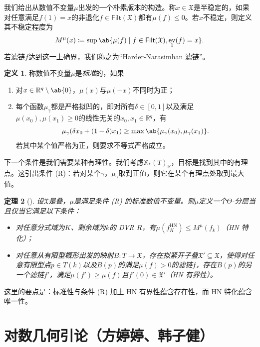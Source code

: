 \documentclass{amsart}
\newtheorem{thm}{定理}[section]
\theoremstyle{definition}
\newtheorem{defn}[thm]{定义}
\theoremstyle{remark}
\theoremstyle{plain}
\theoremstyle{definition}
\theoremstyle{remark}
\newcommand{\R}{\mathbb{R}}
\newcommand{\mf}[1]{\mathfrak{#1}}
\newcommand{\mr}[1]{\mathrm{#1}}
\newcommand{\ms}[1]{\mathsf{#1}}
\newcommand{\1}{\mathbf{1}}
\newcommand{\2}{\mathbf{2}}
\newcommand{\3}{\mathbf{3}}
\DeclareMathOperator{\ev}{ev}
\begin{document}
我们给出从数值不变量\(\mu\)出发的一个朴素版本的构造。称\(x \in \mf{X}\)是半稳定的，如果对任意满足\(f(1) = x\)的非退化\(f \in \ms{Filt}(\mf{X})\)都有\(\mu(f) \leq 0\)。若\(x\)不稳定，则定义其不稳定程度为
\[ M^{\mu}(x) \coloneqq \sup \ab\{ \mu(f) \mid f \in \ms{Filt}(\mf{X}), \ev_1(f) = x\}. \]
若滤链\(f\)达到这一上确界，我们称之为“Harder-Narasimhan 滤链”。

\begin{defn}
    称数值不变量\(\mu\)是\textit{标准}的，如果
    \begin{enumerate}
        \item 对\(x \in \R^q \setminus \ab\{0\}\)，\(\mu(x)\)与\(\mu(-x)\)不同时为正；
        \item 每个函数\(\mu_{\gamma}\)都是严格拟凹的，即对所有\(\delta \in [0,1]\)以及满足\(\mu(x_0), \mu(x_1) \geq 0\)的线性无关的\(x_0, x_1 \in \R^q\)，有
            \[\mu_{\gamma}(\delta x_0 + (1-\delta)x_1) \geq \max\ab\{\mu_{\gamma}(x_0), \mu_{\gamma}(x_1)\}.\] 若其中某个值严格为正，则要求不等式严格成立。
    \end{enumerate}
\end{defn}

下一个条件是我们需要某种有理性。我们考虑\(\mathbb{X}_*(T)_{\R}\)，目标是找到其中的有理点。这引出条件 (R)：若对某个\(\gamma\)，\(\mu_{\gamma}\)取到正值，则它在某个有理点处取到最大值。

\begin{thm}[{\cite{HLinstability}}]
    设\(\mf{X}\)是叠，\(\mu\)是满足条件 (R) 的标准数值不变量。则\(\mu\)定义一个\(\Theta\)-分层当且仅当它满足以下条件：
    \begin{itemize}
        \item 对任意分式域为\(K\)、剩余域为\(k\)的 DVR \(R\)，有\(\mu(f_K^{\mr{HN}}) \leq M^{\mu}(f_k)\)（HN 特化）；
        \item 对任意从有限型概形出发的映射\(B \colon T \to \mf{X}\)，存在拟紧开子叠\(\mf{X}' \subseteq \mf{X}\)，使得对任意有限型点\(p \in T(k)\)以及\(B(p)\)的满足\(\mu(f) > 0\)的滤链\(f\)，存在\(B(p)\)的另一个滤链\(f'\)，满足\(\mu(f') \geq \mu(f)\)且\(f'(0) \in \mf{X}'\)（HN 有界性）。
    \end{itemize}
\end{thm}

这里的要点是：标准性与条件 (R) 加上 HN 有界性蕴含存在性，而 HN 特化蕴含唯一性。



\section{对数几何引论（方婷婷、韩子健）}%
\label{sec:Intro to log geometry (Tingting Fang and Zijian Han)}
\end{document}

